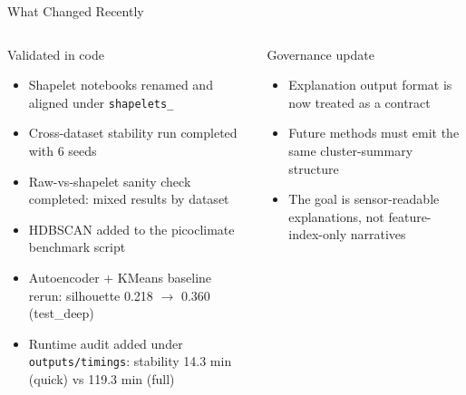 \documentclass[aspectratio=169]{beamer}
\begin{document}
\begin{frame}{What Changed Recently}
\begin{columns}[T,onlytextwidth]
  \begin{block}{Validated in code}
    {\scriptsize
    \begin{itemize}\setlength\itemsep{1pt}
      \item Shapelet notebooks renamed and aligned under \texttt{shapelets\_}
      \item Cross-dataset stability run completed with 6 seeds
      \item Raw-vs-shapelet sanity check completed: mixed results by dataset
      \item HDBSCAN added to the picoclimate benchmark script
      \item Autoencoder + KMeans baseline rerun: silhouette 0.218 $\to$ 0.360 (test\_deep)
      \item Runtime audit added under \texttt{outputs/timings}: stability 14.3 min (quick) vs 119.3 min (full)
    \end{itemize}
    }
  \end{block}

  \begin{block}{Governance update}
    \begin{itemize}
      \item Explanation output format is now treated as a contract
      \item Future methods must emit the same cluster-summary structure
      \item The goal is sensor-readable explanations, not feature-index-only narratives
    \end{itemize}
  \end{block}
\end{columns}
\end{frame}
\end{document}
